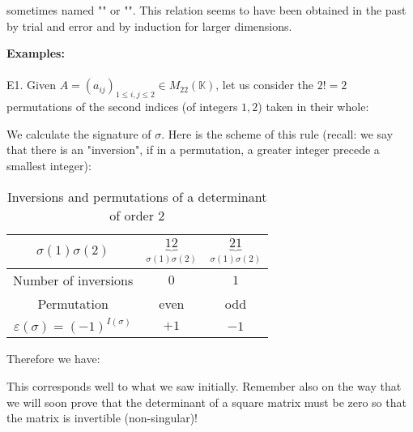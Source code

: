 	sometimes named "\label{leibniz formula}" or "". This relation seems to have been obtained in the past by trial and error and by induction for larger dimensions.
	
	\pagebreak
	\begin{tcolorbox}[colframe=black,colback=white,sharp corners]
	\textbf{{\Large {}}Examples:}\\\\
	E1. Given $A=(a_{ij})_{1\leq i,j\leq 2}\in M_{22}(\mathbb{K})$, let us consider the $2!=2$ permutations of the second indices (of integers $1,2$) taken in their whole\label{determinant of two by two matrix}:
	
	We calculate the signature of $\sigma$. Here is the scheme of this rule (recall: we say that there is an "inversion", if in a permutation, a greater integer precede a smallest integer):
	\begin{table}[H]	
		\begin{center}
			\begin{tabular}{|c|c|c|}
			\hline
			  \rowcolor[gray]{0.75}$\sigma(1)\sigma(2)$ & $\underbrace{12}_{\sigma(1)\sigma(2)}$ & $\underbrace{21}_{\sigma(1)\sigma(2)}$ \\
			  \hline
			  \cellcolor{black!30}Number of inversions & $0$ & $1$ \\\hline
			  \cellcolor{black!30}Permutation & even & odd  \\\hline
			  \cellcolor{black!30}$\varepsilon(\sigma)=(-1)^{I(\sigma)}$ & $+1$ & $-1$ \\\hline
			\end{tabular}
		\end{center}
		\caption{Inversions and permutations of a determinant of order $2$}
	\end{table}
	Therefore we have:
	
	This corresponds well to what we saw initially. Remember also on the way that we will soon prove that the determinant of a square matrix must be zero so that the matrix is invertible (non-singular)!\\
	

\end{tcolorbox}
